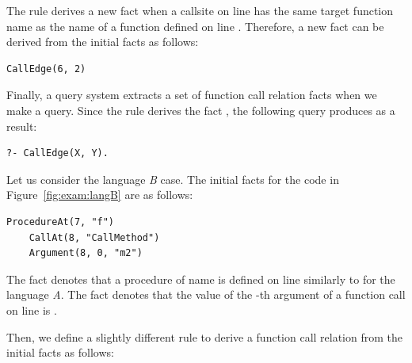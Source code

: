 
\noindent
The rule derives a new fact  when a callsite on line
 has the same target function name as the name of a function defined
on line . Therefore, a new fact can be derived from the initial facts
as follows: 

\begin{lstlisting}[style=mrule]
    CallEdge(6, 2)
\end{lstlisting}

Finally, a query system extracts a set of function call relation facts when we
make a query. Since the rule derives the fact , the
following query produces  as a result:


\begin{lstlisting}[style=mrule]
    ?- CallEdge(X, Y).
\end{lstlisting}


Let us consider the language {\it B} case.
The initial facts for the code in Figure~\ref{fig:exam:langB} are as follows: 

\begin{lstlisting}[style=mrule]
    ProcedureAt(7, "f")
    CallAt(8, "CallMethod")
    Argument(8, 0, "m2")
\end{lstlisting}

\noindent
The fact  denotes that a procedure of name
 is defined on line  similarly to
 for the language {\it A}.
The fact  denotes that the value of
the -th argument of a function call on line  is .

Then, we define a slightly different rule to derive a function call relation
from the initial facts as follows: 

